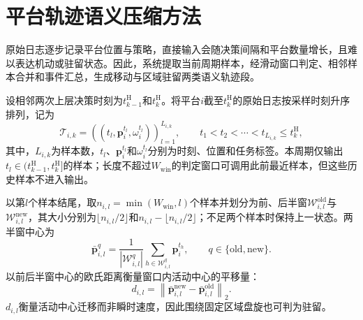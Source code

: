\chapter{平台轨迹语义压缩方法}
\label{app:platform-trajectory-compression}

原始日志逐步记录平台位置与策略，直接输入会随决策间隔和平台数量增长，且难以表达机动或驻留状态。因此，系统提取当前周期样本，经滑动窗口判定、相邻样本合并和事件汇总，生成移动与区域驻留两类语义轨迹段。

设相邻两次上层决策时刻为$t_{k-1}^{\mathrm H}$和$t_k^{\mathrm H}$。将平台$i$截至$t_k^{\mathrm H}$的原始日志按采样时刻升序排列，记为
\begin{equation}
    \mathcal T_{i,k}
    =\left(
    \left(t_l,\boldsymbol p_i^{t_l},\omega_i^{t_l}\right)
    \right)_{l=1}^{L_{i,k}},
    \qquad
    t_1<t_2<\cdots<t_{L_{i,k}}\leq t_k^{\mathrm H},
    \label{eq:appendix-trajectory-samples}
\end{equation}
其中，$L_{i,k}$为样本数，$t_l$、$\boldsymbol p_i^{t_l}$和$\omega_i^{t_l}$分别为时刻、位置和任务标签。本周期仅输出$t_l\in(t_{k-1}^{\mathrm H},t_k^{\mathrm H}]$的样本；长度不超过$W_{\mathrm{win}}$的判定窗口可调用此前最近样本，但这些历史样本不进入输出。

以第$l$个样本结尾，取$n_{i,l}=\min(W_{\mathrm{win}},l)$个样本并划分为前、后半窗$\mathcal W_{i,l}^{\mathrm{old}}$与$\mathcal W_{i,l}^{\mathrm{new}}$，其大小分别为$\lfloor n_{i,l}/2\rfloor$和$n_{i,l}-\lfloor n_{i,l}/2\rfloor$；不足两个样本时保持上一状态。两半窗中心为
\begin{equation}
    \bar{\boldsymbol p}_{i,l}^{q}
    =\frac{1}{|\mathcal W_{i,l}^{q}|}
    \sum_{h\in\mathcal W_{i,l}^{q}}\boldsymbol p_i^{t_h},
    \qquad q\in\{\mathrm{old},\mathrm{new}\}.
    \label{eq:appendix-window-centers}
\end{equation}
以前后半窗中心的欧氏距离衡量窗口内活动中心的平移量：
\begin{equation}
    d_{i,l}=\left\|
    \bar{\boldsymbol p}_{i,l}^{\mathrm{new}}
    -\bar{\boldsymbol p}_{i,l}^{\mathrm{old}}
    \right\|_2.
    \label{eq:appendix-center-shift}
\end{equation}
$d_{i,l}$衡量活动中心迁移而非瞬时速度，因此围绕固定区域盘旋也可判为驻留。

